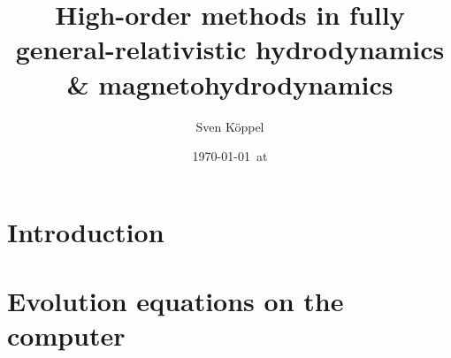 
\def\releasemode{1}


\makeatletter
{}
\makeatother





\title{
	High-order methods in fully general-relativistic
	hydrodynamics \&
	magnetohydrodynamics
}
\newcommand\thesubtitle{Oder so ähnlich}
\author{Sven Köppel}
\date{\today\ at \currenttime}



%



\chapter{Introduction}\label{chapter:intro}


\chapter{Evolution equations on the computer}\label{chapter:numerics}




